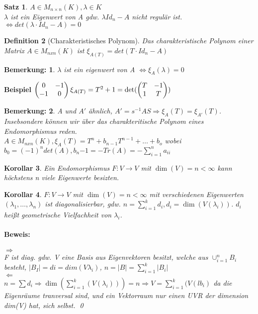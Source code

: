 \documentclass{report}
\newcommand{\lb}{\lambda}
\theoremstyle{customrem}
\newtheorem*{bemerkung}{Bemerkung\textnormal:}
\theoremstyle{customdef}
\newtheorem{definition}{Definition}[chapter]
\newtheorem{korrolar}[definition]{Korollar}
\newtheorem{satz}[definition]{Satz}
\renewenvironment{proof}{\paragraph{Beweis: }}{\qed}
\theoremstyle{customenv}
\begin{document}
\begin{satz}
  \(A \in M_{n\times n}(K), \lb \in K\)\\
  \(\lb\) ist ein Eigenwert von A gdw. \(\lb Id_n - A\) nicht regul\"ar ist.
  \(\Leftrightarrow det(\lb \cdot Id_n -A) = 0\)
\end{satz}

\begin{definition}[Charakteristisches Polynom]
  Das charakteristische Polynom einer Matrix \(A \in M_{nxn}(K)\) ist 
  \(\xi_{A(T)} = det(T \cdot Id_n - A)\)
\end{definition}

\begin{bemerkung}
  \(\lb\) ist ein eigenwert von A \(\Leftrightarrow \xi_A(\lb) = 0\)
\end{bemerkung}

\textbf{Beispiel}
\(
  \begin{pmatrix}
   0 & -1\\
   -1 & 0
  \end{pmatrix}\\
  \xi_{A(T)} = T^2 + 1 = \det(
  \begin{pmatrix}
    T & -1\\
    1 & T
  \end{pmatrix}
  )
\)

\begin{bemerkung}
  A und \(A'\) \"ahnlich, \(A' = s^{-1}AS \Rightarrow \xi_A(T) = \xi_{A'}(T)\).
  Insebsondere k\"onnen wir \"uber das charakteritische Polynom eines
  Endomorphismus reden.\\
  \(A \in M_{nxn}(K), \xi_A(T) = T^n + b_{n-1} T^{n-1} + \dots + b_o\) wobei
  \(b_0 = (-1)^n det(A), b_n{-1} = - Tr(A) = - \sum_{i=1}^n a_{ii}\)
\end{bemerkung}

\begin{korrolar}
  Ein Endomorphismus \(F : V \to V\) mit \(\dim(V) = n < \infty\) kann
  h\"ochstens n viele Eigenwerte besizten.
\end{korrolar}

\begin{korrolar}
  \(F : V \to V\) mit \(\dim(V) = n < \infty\) mit verschiedenen Eigenwerten
  \((\lb_1, \dots, \lb_n)\) ist diagonalisierbar,  gdw. 
  \(n = \sum_{i=1}^k d_i, d_i = \dim(V(\lb_i))\). \(d_i\) hei\ss{}t geometrische
  Vielfachheit von \(\lb_i\).
  
  \begin{proof} \hfill\break
  \(\Rightarrow\)\\
  F ist diag. gdw. V eine Basis aus Eigenvektoren besitzt, welche aus
  \(\cup_{i=1}^n B_i\) besteht, \(|B_I| = di = dim(V\lb_i)\),
  \(n = |B| = \sum_{i=1}^k |B_i|\)\\
  \(\Leftarrow\)\\
    \(n = \sum d_i \Rightarrow \dim(\sum_{i=1}^k (V(\lb_i))) = n
    \Rightarrow V = \sum_{i=1}^k(V(lb_i)\) da die Eigenr\"aume tranversal sind,
     und ein Vektorraum nur einen UVR der dimension dim(V) hat, sich selbst.
  \end{proof}
\end{korrolar}
\end{document}

